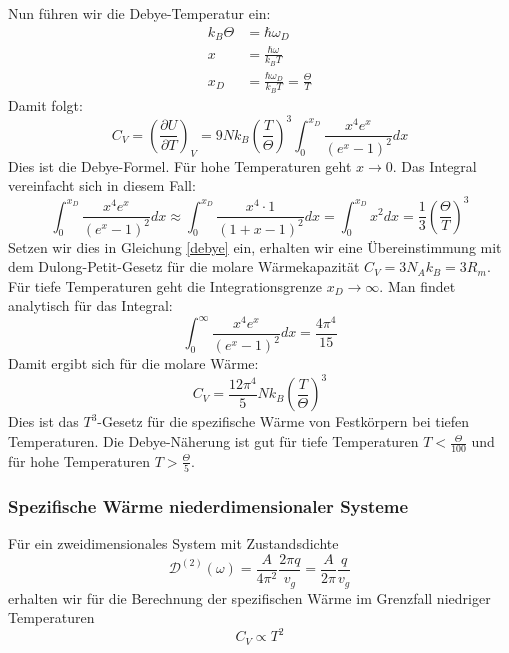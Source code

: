\documentclass[11pt]{article}
\begin{document}
Nun führen wir die Debye-Temperatur ein:
\begin{equation}
  \begin{align}
    k_B\Theta&=\hbar\omega_D \\
    x&=\frac{\hbar\omega}{k_BT}\\
    x_D&=\frac{\hbar\omega_D}{k_BT}=\frac{\Theta}{T}
  \end{align}
\end{equation}
Damit folgt:
\begin{equation}\label{debye}
  C_V=\left(\frac{\partial U}{\partial T}\right)_V=9Nk_B\left(\frac{T}{\Theta}
  \right)^3\int_0^{x_D}\frac{x^4e^x}{(e^x-1)^2}dx
\end{equation}
Dies ist die Debye-Formel. Für hohe Temperaturen geht $x \to 0$. Das Integral
vereinfacht sich in diesem Fall:
\begin{equation}
  \int_0^{x_D}\frac{x^4e^x}{(e^x-1)^2}dx \approx \int_0^{x_D}\frac{x^4\cdot 1}
  {(1+x-1)^2}dx = \int_0^{x_D}x^2dx=\frac{1}{3}\left(\frac{\Theta}{T}\right)^3
\end{equation}
Setzen wir dies in Gleichung \ref{debye} ein, erhalten wir eine Übereinstimmung
mit dem Dulong-Petit-Gesetz für die molare Wärmekapazität $C_V=3N_Ak_B=3R_m$.
Für tiefe Temperaturen geht die Integrationsgrenze $x_D\to\infty$. Man findet
analytisch für das Integral:
\begin{equation}
  \int_0^\infty\frac{x^4e^x}{(e^x-1)^2}dx=\frac{4\pi^4}{15}
\end{equation}
Damit ergibt sich für die molare Wärme:
\begin{equation}
  C_V=\frac{12\pi^4}{5}Nk_B\left(\frac{T}{\Theta}\right)^3
\end{equation}
Dies ist das $T^3$-Gesetz für die spezifische Wärme von Festkörpern bei tiefen
Temperaturen. Die Debye-Näherung ist gut für tiefe Temperaturen $T<\frac{\Theta}
{100}$ und für hohe Temperaturen $T>\frac{\Theta}{5}$.
\subsubsection{Spezifische Wärme niederdimensionaler Systeme}
Für ein zweidimensionales System mit Zustandsdichte
\begin{equation}
  \mathcal{D}^{(2)}(\omega)=\frac{A}{4\pi^2}\frac{2\pi q}{v_g}=\frac{A}{2\pi}
  \frac{q}{v_g}
\end{equation}
erhalten wir für die Berechnung der spezifischen Wärme im Grenzfall niedriger
Temperaturen
\begin{equation}
  C_V \propto T^2
\end{equation}
\end{document}
